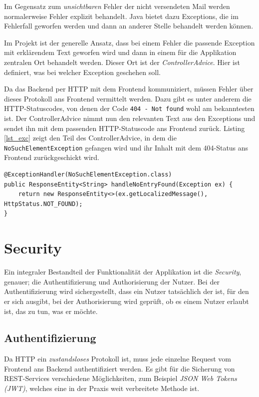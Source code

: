 \documentclass[a4paper, 11pt]{article}
\begin{document}
Im Gegensatz zum \emph{unsichtbaren} Fehler der nicht versendeten Mail werden
normalerweise Fehler explizit behandelt. Java bietet dazu Exceptions, die im
Fehlerfall geworfen werden und dann an anderer Stelle behandelt werden können.

Im Projekt ist der generelle Ansatz, dass bei einem Fehler die passende
Exception mit erklärendem Text geworfen wird und dann in einem für die
Applikation zentralen Ort behandelt werden. Dieser Ort ist der
\emph{ControllerAdvice}. Hier ist definiert, was bei welcher Exception
geschehen soll. 

Da das Backend per HTTP mit dem Frontend kommuniziert, müssen Fehler über
dieses Protokoll ans Frontend vermittelt werden. Dazu gibt es unter anderem die
HTTP-Statuscodes, von denen der Code \lstinline{404 - Not found} wohl am
bekanntesten ist. Der ControllerAdvice nimmt nun den relevanten Text aus den
Exceptions und sendet ihn mit dem passenden HTTP-Statuscode ans Frontend
zurück. Listing \ref{lst_exc} zeigt den Teil des ControllerAdvice, in dem die
\lstinline{NoSuchElementException} gefangen wird und ihr Inhalt mit dem
404-Status ans Frontend zurückgeschickt wird.

\begin{lstlisting}[caption=Globales Handling der NoSuchElementException, label=lst_exc]
@ExceptionHandler(NoSuchElementException.class)
public ResponseEntity<String> handleNoEntryFound(Exception ex) {
    return new ResponseEntity<>(ex.getLocalizedMessage(), HttpStatus.NOT_FOUND);
}
\end{lstlisting}

\section{Security}

Ein integraler Bestandteil der Funktionalität der Applikation ist die
\emph{Security}, genauer; die Authentifizierung und Authorisierung der Nutzer.
Bei der Authentifizierung wird sichergestellt, dass ein Nutzer tatsächlich der
ist, für den er sich ausgibt, bei der Authorisierung wird geprüft, ob es einem
Nutzer erlaubt ist, das zu tun, was er möchte.

\subsection{Authentifizierung}

Da HTTP ein \emph{zustandsloses} Protokoll ist, muss jede einzelne Request vom
Frontend ans Backend authentifiziert werden. Es gibt für die Sicherung von
REST-Services verschiedene Möglichkeiten, zum Beispiel \emph{JSON Web Tokens
(JWT)}, welches eine in der Praxis weit verbreitete Methode ist.
\end{document}
